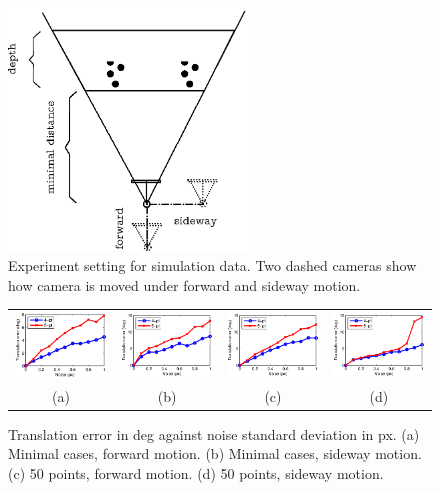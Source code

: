 \documentclass[letterpaper, 10 pt, conference]{ieeeconf}
\begin{document}
\begin{figure}
\begin{center}
	\includegraphics[width=2.5in]{setting.ps} 
\end{center}
\caption{Experiment setting for simulation data. Two dashed cameras show how camera is moved under forward and sideway motion. }
\label{SettingFigure}
\end{figure}

\begin{figure}
\begin{tabular}{cccc}
	\includegraphics[width=1.6in]{forward_minimal.eps} & 
	\includegraphics[width=1.6in]{forward_ransac.eps} & 
	\includegraphics[width=1.6in]{sideway_minimal.eps} & 
	\includegraphics[width=1.6in]{sideway_ransac.eps} \\ 
	(a) & (b) & (c) & (d) 
\end{tabular}	
\caption{Translation error in deg against noise standard deviation in px. (a) Minimal cases, forward motion. (b) Minimal cases, sideway motion. (c) 50 points, forward motion. (d) 50 points, sideway motion. }
\label{SimulationFigure1}
\end{figure}
\end{document}

